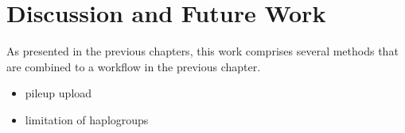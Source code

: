 \chapter{Discussion and Future Work}
\label{outlook}
As presented in the previous chapters, this work comprises several methods that are combined to a workflow in the previous chapter. 
\begin{itemize}
\item pileup upload
\item limitation of haplogroups
\end{itemize}